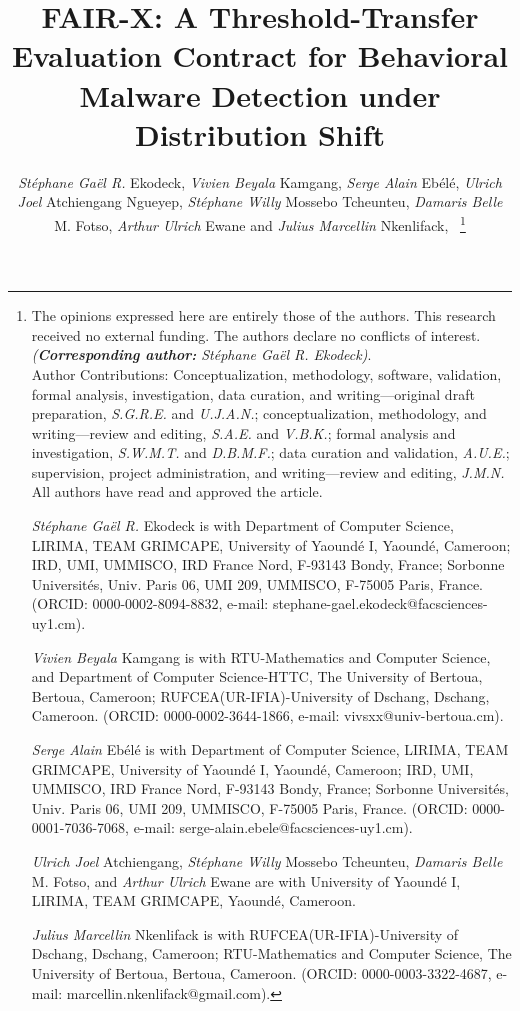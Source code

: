 \documentclass[10pt,journal,compsoc]{IEEEtran}
\begin{document}
\title{FAIR-X: A Threshold-Transfer Evaluation Contract for Behavioral Malware Detection under Distribution Shift}

\author{\emph{St\'{e}phane Ga\"{e}l R.} Ekodeck, \emph{Vivien Beyala} Kamgang, \emph{Serge Alain} Eb\'{e}l\'{e}, \emph{Ulrich Joel} Atchiengang Ngueyep,  \emph{St\'{e}phane Willy} Mossebo Tcheunteu,  \emph{Damaris Belle} M. Fotso,  \emph{Arthur Ulrich} Ewane and \emph{Julius Marcellin} Nkenlifack,~
\thanks{The opinions expressed here are entirely those of the authors. This research received no external funding. The authors declare no conflicts of interest. \emph{(\textbf{Corresponding author:} St\'{e}phane Ga\"{e}l R. Ekodeck)}. \\
Author Contributions: Conceptualization, methodology, software, validation, formal analysis, investigation, data curation, and writing---original draft preparation, \emph{S.G.R.E.} and \emph{U.J.A.N.}; conceptualization, methodology, and writing---review and editing, \emph{S.A.E.} and \emph{V.B.K.}; formal analysis and investigation, \emph{S.W.M.T.} and \emph{D.B.M.F.}; data curation and validation, \emph{A.U.E.}; supervision, project administration, and writing---review and editing, \emph{J.M.N.} All authors have read and approved the article.
\par \emph{St\'{e}phane Ga\"{e}l R.} Ekodeck is with Department of Computer Science, LIRIMA, TEAM GRIMCAPE, University of Yaound\'{e} I, Yaound\'{e}, Cameroon; IRD, UMI, UMMISCO, IRD France Nord, F-93143 Bondy, France; Sorbonne Universit\'{e}s, Univ. Paris 06, UMI 209, UMMISCO, F-75005 Paris, France. (ORCID: 0000-0002-8094-8832, e-mail: stephane-gael.ekodeck@facsciences-uy1.cm).
\par \emph{Vivien Beyala} Kamgang is with RTU-Mathematics and Computer Science, and Department of Computer Science-HTTC, The University of Bertoua, Bertoua, Cameroon; RUFCEA(UR-IFIA)-University of Dschang, Dschang, Cameroon. (ORCID: 0000-0002-3644-1866, e-mail: vivsxx@univ-bertoua.cm).
\par \emph{Serge Alain} Eb\'{e}l\'{e} is with Department of Computer Science, LIRIMA, TEAM GRIMCAPE, University of Yaound\'{e} I, Yaound\'{e}, Cameroon; IRD, UMI, UMMISCO, IRD France Nord, F-93143 Bondy, France; Sorbonne Universit\'{e}s, Univ. Paris 06, UMI 209, UMMISCO, F-75005 Paris, France. (ORCID: 0000-0001-7036-7068, e-mail: serge-alain.ebele@facsciences-uy1.cm).
\par \emph{Ulrich Joel} Atchiengang, \emph{St\'{e}phane Willy} Mossebo Tcheunteu, \emph{Damaris Belle} M. Fotso, and \emph{Arthur Ulrich} Ewane are with University of Yaound\'{e} I, LIRIMA, TEAM GRIMCAPE, Yaound\'{e}, Cameroon.
\par \emph{Julius Marcellin} Nkenlifack is with RUFCEA(UR-IFIA)-University of Dschang, Dschang, Cameroon; RTU-Mathematics and Computer Science, The University of Bertoua, Bertoua, Cameroon. (ORCID: 0000-0003-3322-4687, e-mail: marcellin.nkenlifack@gmail.com).}}
\end{document}
